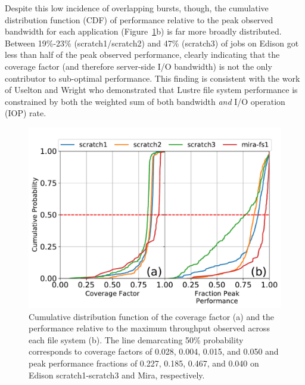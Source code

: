 \documentclass[conference,10pt,compsocconf]{IEEEtran}
\begin{document}
Despite this low incidence of overlapping bursts, though, the cumulative
distribution function (CDF) of performance relative to the peak observed
bandwidth for each application (Figure~\ref{fig:cdfs}b) is far more broadly distributed.
Between 19\%-23\% (scratch1/scratch2) and 47\% (scratch3) of jobs on Edison got less than half of the peak observed performance, clearly indicating that the coverage factor (and therefore server-side
I/O bandwidth) is not the only contributor to sub-optimal performance.  
This finding is consistent with
the work of Uselton and Wright\cite{Uselton2013} who demonstrated that Lustre
file system performance is constrained by both the weighted sum of both bandwidth
\emph{and} I/O operation (IOP) rate.  

\begin{figure}[t]
	\centering
	\includegraphics[width=\columnwidth]{figs/cdf-both.pdf}
	\caption{Cumulative distribution function of the coverage factor (a) and the
	performance relative to the maximum throughput observed across each file system
	(b).  The line demarcating 50\% probability corresponds to coverage factors of
	0.028, 0.004, 0.015, and 0.050 and peak performance fractions of 0.227, 0.185,
	0.467, and 0.040 on Edison scratch1-scratch3 and Mira, respectively.}
	\label{fig:cdfs}
\end{figure}
\end{document}
